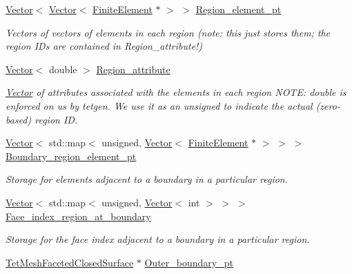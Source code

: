 \begin{DoxyCompactItemize}
\item 
\hyperlink{classoomph_1_1Vector}{Vector}$<$ \hyperlink{classoomph_1_1Vector}{Vector}$<$ \hyperlink{classoomph_1_1FiniteElement}{Finite\+Element} $\ast$ $>$ $>$ \hyperlink{classoomph_1_1TetMeshBase_ad6f68657b2b392f77853af7e147cb23f}{Region\+\_\+element\+\_\+pt}
\begin{DoxyCompactList}\small\item\em Vectors of vectors of elements in each region (note\+: this just stores them; the region I\+Ds are contained in Region\+\_\+attribute!) \end{DoxyCompactList}\item 
\hyperlink{classoomph_1_1Vector}{Vector}$<$ double $>$ \hyperlink{classoomph_1_1TetMeshBase_a27ed0a5a15bb0eb66646ff6f55363a6a}{Region\+\_\+attribute}
\begin{DoxyCompactList}\small\item\em \hyperlink{classoomph_1_1Vector}{Vector} of attributes associated with the elements in each region N\+O\+TE\+: double is enforced on us by tetgen. We use it as an unsigned to indicate the actual (zero-\/based) region ID. \end{DoxyCompactList}\item 
\hyperlink{classoomph_1_1Vector}{Vector}$<$ std\+::map$<$ unsigned, \hyperlink{classoomph_1_1Vector}{Vector}$<$ \hyperlink{classoomph_1_1FiniteElement}{Finite\+Element} $\ast$ $>$ $>$ $>$ \hyperlink{classoomph_1_1TetMeshBase_a674ccfa46efe3de473a3daafe65dc537}{Boundary\+\_\+region\+\_\+element\+\_\+pt}
\begin{DoxyCompactList}\small\item\em Storage for elements adjacent to a boundary in a particular region. \end{DoxyCompactList}\item 
\hyperlink{classoomph_1_1Vector}{Vector}$<$ std\+::map$<$ unsigned, \hyperlink{classoomph_1_1Vector}{Vector}$<$ int $>$ $>$ $>$ \hyperlink{classoomph_1_1TetMeshBase_a79260313236fa264d56b2736f7347e35}{Face\+\_\+index\+\_\+region\+\_\+at\+\_\+boundary}
\begin{DoxyCompactList}\small\item\em Storage for the face index adjacent to a boundary in a particular region. \end{DoxyCompactList}\item 
\hyperlink{classoomph_1_1TetMeshFacetedClosedSurface}{Tet\+Mesh\+Faceted\+Closed\+Surface} $\ast$ \hyperlink{classoomph_1_1TetMeshBase_a8824b79dcd8c46e4e2c1132c39bb0172}{Outer\+\_\+boundary\+\_\+pt}

\end{DoxyCompactItemize}
